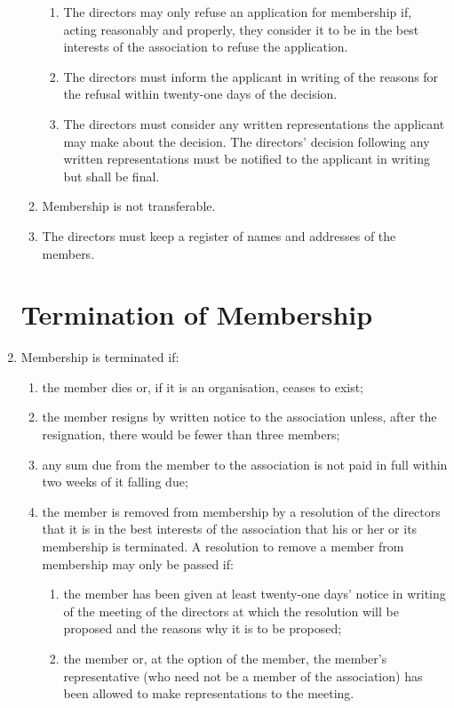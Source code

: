 \begin{enumerate}
\begin{enumerate}
    \begin{enumerate}
    \item
      The directors may only refuse an application for membership if,
      acting reasonably and properly, they consider it to be in the best
      interests of the association to refuse the application.
    \item
      The directors must inform the applicant in writing of the reasons
      for the refusal within twenty-one days of the decision.
    \item
      The directors must consider any written representations the
      applicant may make about the decision. The directors' decision
      following any written representations must be notified to the
      applicant in writing but shall be final.
    \end{enumerate}
  \item
    Membership is not transferable.
  \item
    The directors must keep a register of names and addresses of the
    members.
  \end{enumerate}

\section{Termination of Membership}

\item
  Membership is terminated if:
  \begin{enumerate}
  \item
    the member dies or, if it is an organisation, ceases to exist;
  \item
    the member resigns by written notice to the association unless, after
    the resignation, there would be fewer than three members;
  \item
    any sum due from the member to the association is not paid in full
    within two weeks of it falling due;
  \item
    the member is removed from membership by a resolution of the
    directors that it is in the best interests of the association that his
    or her or its membership is terminated. A resolution to remove a
    member from membership may only be passed if:
    \begin{enumerate}
    \item
      the member has been given at least twenty-one days' notice in
      writing of the meeting of the directors at which the resolution
      will be proposed and the reasons why it is to be proposed;
    \item
      the member or, at the option of the member, the member's
      representative (who need not be a member of the association) has been
      allowed to make representations to the meeting.
    \end{enumerate}
  \end{enumerate}


\end{enumerate}
